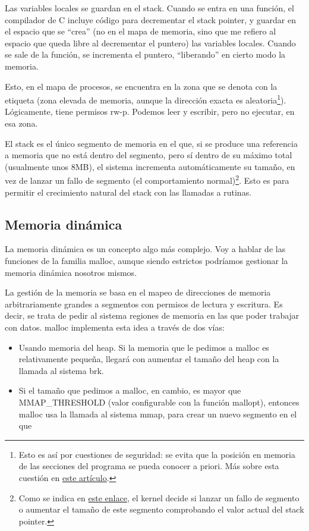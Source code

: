 \documentclass[a4paper]{article}
\begin{document}
Las variables locales se guardan en el stack. Cuando se entra en una función, el compilador de C incluye código para decrementar el stack pointer, y guardar en el espacio que se ``crea'' (no en el mapa de memoria, sino que me refiero al espacio que queda libre al decrementar el puntero) las variables locales. Cuando se sale de la función, se incrementa el puntero, ``liberando'' en cierto modo la memoria.

Esto, en el mapa de procesos, se encuentra en la zona que se denota con la etiqueta {\ttfamily [stack]} (zona elevada de memoria, aunque la dirección exacta es aleatoria\footnote{Esto es así por cuestiones de seguridad: se evita que la posición en memoria de las secciones del programa se pueda conocer a priori. Más sobre esta cuestión en \href{https://manybutfinite.com/post/anatomy-of-a-program-in-memory/}{este artículo}.}). Lógicamente, tiene permisos {\ttfamily rw-p}. Podemos leer y escribir, pero no ejecutar, en esa zona.

El stack es el único segmento de memoria en el que, si se produce una referencia a memoria que no está dentro del segmento, pero sí dentro de su máximo total (usualmente unos 8MB), el sistema incrementa automáticamente su tamaño, en vez de lanzar un fallo de segmento (el comportamiento normal)\footnote{Como se indica en \href{https://stackoverflow.com/questions/54564273/dynamic-expansion-of-the-linux-stack}{este enlace}, el kernel decide si lanzar un fallo de segmento o aumentar el tamaño de este segmento comprobando el valor actual del stack pointer.}. Esto es para permitir el crecimiento natural del {\ttfamily stack} con las llamadas a rutinas.

\subsection{Memoria dinámica}

La memoria dinámica es un concepto algo más complejo. Voy a hablar de las funciones de la familia {\ttfamily malloc}, aunque siendo estrictos podríamos gestionar la memoria dinámica nosotros mismos.

La gestión de la memoria se basa en el mapeo de direcciones de memoria arbitrariamente grandes a segmentos con permisos de lectura y escritura. Es decir, se trata de pedir al sistema regiones de memoria en las que poder trabajar con datos. {\ttfamily malloc} implementa esta idea a través de dos vías:
\begin{itemize}
    \item Usando memoria del {\ttfamily heap}. Si la memoria que le pedimos a {\ttfamily malloc} es relativamente pequeña, llegará con aumentar el tamaño del {\ttfamily heap} con la llamada al sistema {\ttfamily brk}.
    \item Si el tamaño que pedimos a {\ttfamily malloc}, en cambio, es mayor que {\ttfamily MMAP\_THRESHOLD} (valor configurable con la función {\ttfamily mallopt}), entonces {\ttfamily malloc} usa la llamada al sistema {\ttfamily mmap}, para crear un nuevo segmento en el que 
\end{itemize}
\end{document}
